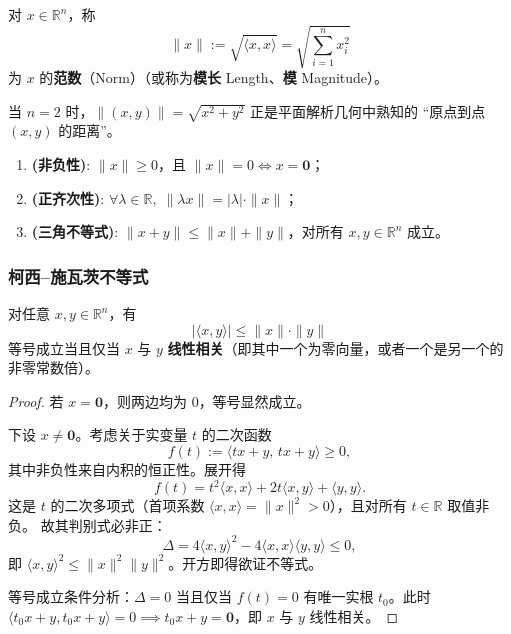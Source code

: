 \documentclass[lang=cn,11pt]{elegantbook}
\begin{document}
\begin{definition}[范数 / Norm] \label{def:norm}
对 $x\in\mathbb R^n$，称
\[
\boxed{\;\|x\|:=\sqrt{\langle x,x\rangle} = \sqrt{\sum_{i=1}^{n}x_i^2}\;}
\]
为 $x$ 的\textbf{范数}（Norm）（或称为\textbf{模长} Length、\textbf{模} Magnitude）。
\end{definition}

当 $n=2$ 时，$\|(x,y)\|=\sqrt{x^2+y^2}$ 正是平面解析几何中熟知的 ``原点到点 $(x,y)$ 的距离''。

\begin{property}[范数的基本性质] \label{prop:norm-properties}
\begin{enumerate}
  \item\textbf{(非负性)}: $\|x\|\geq 0$，且 $\|x\|=0\Longleftrightarrow x=\boldsymbol 0$；
  \item\textbf{(正齐次性)}: $\forall\lambda\in\mathbb R,\;\|\lambda x\|=|\lambda|\cdot\|x\|$；
  \item\textbf{(三角不等式)}: $\|x+y\|\leq\|x\|+\|y\|$，对所有 $x,y\in\mathbb R^n$ 成立。
\end{enumerate}
\end{property}

\subsubsection{柯西--施瓦茨不等式}

\begin{theorem} \label{thm:cauchy-schwarz}
对任意 $x,y\in\mathbb R^n$，有
\[
\boxed{\;|\langle x,y\rangle|\leq\|x\|\cdot\|y\|\;}
\]
等号成立当且仅当 $x$ 与 $y$ \textbf{线性相关}（即其中一个为零向量，或者一个是另一个的非零常数倍）。
\end{theorem}

\begin{proof}
若 $x=\boldsymbol 0$，则两边均为 $0$，等号显然成立。

下设 $x\neq\boldsymbol 0$。考虑关于实变量 $t$ 的二次函数
\[
f(t):=\langle tx+y,\,tx+y\rangle\geq 0,
\]
其中非负性来自内积的恒正性。展开得
\[
f(t)=t^2\langle x,x\rangle+2t\langle x,y\rangle+\langle y,y\rangle .
\]
这是 $t$ 的二次多项式（首项系数 $\langle x,x\rangle=\|x\|^2>0$），且对所有 $t\in\mathbb R$ 取值非负。
故其判别式必非正：
\[
\Delta=4\langle x,y\rangle^2-4\langle x,x\rangle\langle y,y\rangle\leqslant  0,
\]
即 $\langle x,y\rangle^2\leq\|x\|^2\|y\|^2$。开方即得欲证不等式。

等号成立条件分析：$\Delta=0$ 当且仅当 $f(t)=0$ 有唯一实根 $t_0$。此时 $\langle t_0x+y,t_0x+y\rangle=0 \implies t_0x+y=\boldsymbol 0$，即 $x$ 与 $y$ 线性相关。
\end{proof}
\end{document}
